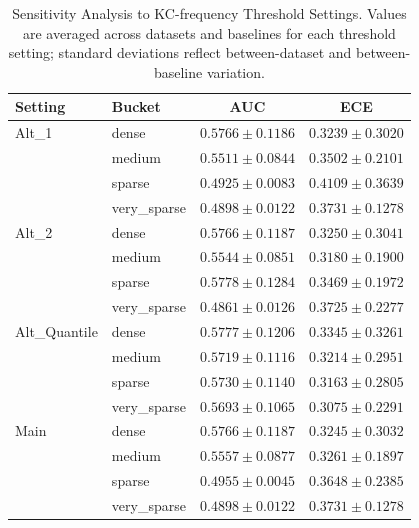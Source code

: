 \begin{table}[htbp]
\caption{Sensitivity Analysis to KC-frequency Threshold Settings. Values are averaged across datasets and baselines for each threshold setting; standard deviations reflect between-dataset and between-baseline variation.}
\label{tab:sensitivity}
\centering

\footnotesize
\setlength{\tabcolsep}{3pt}

\begin{tabular}{llcc}
\toprule
Setting & Bucket & AUC & ECE \\
\midrule
Alt\_1 & dense & $0.5766 \pm 0.1186$ & $0.3239 \pm 0.3020$ \\
 & medium & $0.5511 \pm 0.0844$ & $0.3502 \pm 0.2101$ \\
 & sparse & $0.4925 \pm 0.0083$ & $0.4109 \pm 0.3639$ \\
 & very\_sparse & $0.4898 \pm 0.0122$ & $0.3731 \pm 0.1278$ \\
\midrule
Alt\_2 & dense & $0.5766 \pm 0.1187$ & $0.3250 \pm 0.3041$ \\
 & medium & $0.5544 \pm 0.0851$ & $0.3180 \pm 0.1900$ \\
 & sparse & $0.5778 \pm 0.1284$ & $0.3469 \pm 0.1972$ \\
 & very\_sparse & $0.4861 \pm 0.0126$ & $0.3725 \pm 0.2277$ \\
\midrule
Alt\_Quantile & dense & $0.5777 \pm 0.1206$ & $0.3345 \pm 0.3261$ \\
 & medium & $0.5719 \pm 0.1116$ & $0.3214 \pm 0.2951$ \\
 & sparse & $0.5730 \pm 0.1140$ & $0.3163 \pm 0.2805$ \\
 & very\_sparse & $0.5693 \pm 0.1065$ & $0.3075 \pm 0.2291$ \\
\midrule
Main & dense & $0.5766 \pm 0.1187$ & $0.3245 \pm 0.3032$ \\
 & medium & $0.5557 \pm 0.0877$ & $0.3261 \pm 0.1897$ \\
 & sparse & $0.4955 \pm 0.0045$ & $0.3648 \pm 0.2385$ \\
 & very\_sparse & $0.4898 \pm 0.0122$ & $0.3731 \pm 0.1278$ \\
\bottomrule
\end{tabular}
\end{table}

